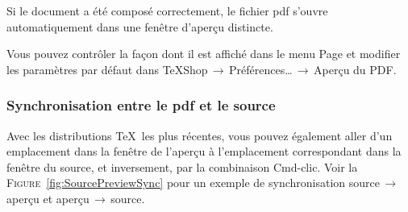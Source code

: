 \documentclass[11pt,french]{article}
\newcommand{\acr}[1]{\textsf{#1}}
\newcommand{\cmd}[1]{\textsf{#1}}
\newcommand{\mnu}[1]{\textsf{#1}}
\newcommand{\To}{\,\(\to\)\,}
\begin{document}
Si le document a été composé correctement, le fichier \acr{pdf} s'ouvre automatiquement dans une fenêtre d'aperçu distincte.

Vous pouvez contrôler la façon dont il est affiché dans le menu \mnu{Page} et modifier les paramètres par défaut dans \mnu{TeXShop}\To\mnu{Préférences…}\To\mnu{Aperçu du PDF}.

%

\subsubsection{Synchronisation entre le \acr{pdf} et le source}

Avec les distributions \TeX\ les plus récentes, vous pouvez également aller d'un emplacement dans la fenêtre de l'aperçu à l'emplacement correspondant dans la fenêtre du source, et inversement, par la combinaison \cmd{Cmd-clic}. Voir la \textsc{Figure}~\vref{fig:SourcePreviewSync} pour un exemple de synchronisation source\To aperçu et aperçu\To source.


\end{document}
